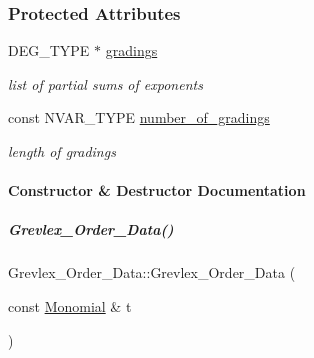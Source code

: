 \subsubsection*{Protected Attributes}
\begin{DoxyCompactItemize}
\item 
\mbox{\label{group__orderinggroup_a0a4ccd9abf8d598bdb64b015f127bf4e}} 
D\+E\+G\+\_\+\+T\+Y\+PE $\ast$ \hyperlink{group__orderinggroup_a0a4ccd9abf8d598bdb64b015f127bf4e}{gradings}
\begin{DoxyCompactList}\small\item\em list of partial sums of exponents \end{DoxyCompactList}\item 
\mbox{\label{group__orderinggroup_afaddc36a549cd365d5f10bd817ddbef5}} 
const N\+V\+A\+R\+\_\+\+T\+Y\+PE \hyperlink{group__orderinggroup_afaddc36a549cd365d5f10bd817ddbef5}{number\+\_\+of\+\_\+gradings}
\begin{DoxyCompactList}\small\item\em length of {\ttfamily gradings} \end{DoxyCompactList}\end{DoxyCompactItemize}


\paragraph{Constructor \& Destructor Documentation}
\mbox{\label{group__orderinggroup_a61000659db1597c1fb7f149deb0d952c}} 
\subparagraph{\texorpdfstring{Grevlex\+\_\+\+Order\+\_\+\+Data()}{Grevlex\_Order\_Data()}}
{\footnotesize\ttfamily Grevlex\+\_\+\+Order\+\_\+\+Data\+::\+Grevlex\+\_\+\+Order\+\_\+\+Data (\begin{DoxyParamCaption}\item[{const \hyperlink{group__polygroup_class_monomial}{Monomial} \&}]{t }\end{DoxyParamCaption})\hspace{0.3cm}{\ttfamily [explicit]}}



